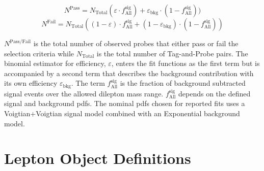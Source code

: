\begin{equation}
	N^{\text{Pass}} = N_{\text{Total}} (\varepsilon \cdot f^{\text{sig}}_{\text{All}} ) +  \varepsilon_{\text{bkg}} \cdot (1-f^{\text{sig} }_{\text{All}}) )
\end{equation} 
\begin{equation}
	N^{\text{Fail}} = N_{\text{Total}} ( (1-\varepsilon) \cdot f^{\text{sig}}_{\text{All}} +   (1-\varepsilon_{\text{bkg}}) \cdot (1-f^{\text{sig}}_{\text{All}}) )
\end{equation}

$N^{\text{Pass/Fail}}$ is the total number of observed probes that either pass or fail the selection criteria while $N_{\text{Total}}$ is the total number of Tag-and-Probe pairs.
The binomial estimator for efficiency, $\varepsilon$, enters the fit functions as the first term but is accompanied by a second term that describes the background contribution with its own efficiency $\varepsilon_{\text{bkg}}$.  The term $f^{\text{sig}}_{\text{All}}$ is the fraction of background subtracted signal events over the allowed dilepton mass range.  $f^{\text{sig}}_{\text{All}}$ depends on the defined signal and background pdfs. The nominal pdfs chosen for reported fits uses a Voigtian+Voigtian signal model combined with an Exponential background model. 








\FloatBarrier
\section{Lepton Object Definitions}


